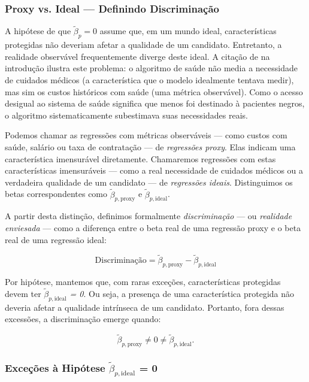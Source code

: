 \documentclass[12pt,a4paper]{article}
\begin{document}
\subsubsection{Proxy vs. Ideal --- Definindo Discriminação}


A hipótese de que $\tilde{\beta}_p = 0$ assume que, em um mundo ideal,
características protegidas não deveriam afetar a qualidade de um
candidato. Entretanto, a realidade observável frequentemente diverge
deste ideal. A citação de \citet{obermeyer2019} na introdução ilustra
este problema: o algoritmo de saúde não media a necessidade de cuidados
médicos (a característica que o modelo idealmente tentava medir), mas
sim os custos históricos com saúde (uma métrica observável). Como o
acesso desigual ao sistema de saúde significa que menos foi destinado à
pacientes negros, o algoritmo sistematicamente subestimava suas
necessidades reais.

Podemos chamar as regressões com métricas observáveis --- como custos
com saúde, salário ou taxa de contratação --- de \textit{regressões proxy}.
Elas indicam uma característica imensurável diretamente. Chamaremos
regressões com estas características imensuráveis --- como a real
necessidade de cuidados médicos ou a verdadeira qualidade de um
candidato --- de \textit{regressões ideais}. Distinguimos os betas
correspondentes como \textit{$\tilde{\beta}_{p,\text{proxy}}$} e \textit{$\tilde{\beta}_{p,\text{ideal}}$}.

A partir desta distinção, definimos formalmente \textit{discriminação} --- ou
\textit{realidade enviesada} --- como a diferença entre o beta real de uma
regressão proxy e o beta real de uma regressão ideal:

\begin{equation}
\text{Discriminação} = \tilde{\beta}_{p,\text{proxy}} - \tilde{\beta}_{p,\text{ideal}}
\end{equation}

Por hipótese, mantemos que, com raras exceções, características
protegidas devem ter \textit{$\tilde{\beta}_{p,\text{ideal}}$ = 0}. Ou seja, a presença de uma
característica protegida não deveria afetar a qualidade intrínseca de um
candidato. Portanto, fora dessas excessões, a discriminação emerge
quando:

\[
\tilde{\beta}_{p,\text{proxy}} \neq 0 \neq \tilde{\beta}_{p,\text{ideal}}.
\]


\subsubsection{Exceções à Hipótese $\tilde{\beta}_{p,\text{ideal}}$ = 0}
\end{document}
